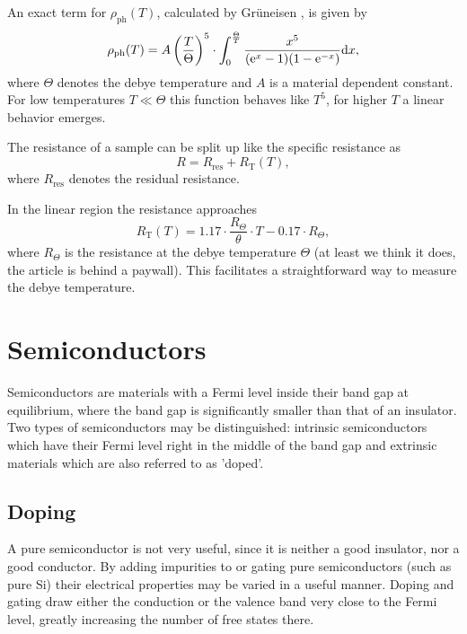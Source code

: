 An exact term for $\rho_\text{ph}(T)$, calculated by Grüneisen \cite{elresistancemetal}, is given by
\begin{equation}
	\rho_\text{ph}(T) = A \left(\frac{T}{\Theta}\right)^5 \cdot \int_0^\frac{\Theta}{T}\frac{x^5}{(\mathrm{e}^x - 1)(1 - \mathrm{e}^{-x})} \text{d} x,
\end{equation}
where $\Theta$ denotes the debye temperature and $A$ is a material dependent constant.
For low temperatures $T \ll \Theta$ this function behaves like $T^5$, for higher $T$ a linear behavior emerges.

The resistance of a sample can be split up like the specific resistance as
\begin{equation*}
	R = R_\text{res} + R_\text{T}(T),
\end{equation*}
where $R_\text{res}$ denotes the residual resistance.

In the linear region the resistance approaches \cite{elresistancemetal}
\begin{equation}\label{eq:borrel}
	R_\text{T}(T) = \num{1.17} \cdot \frac{R_\Theta}{\theta} \cdot T - \num{0.17} \cdot R_\Theta,
\end{equation}
where $R_\Theta$ is the resistance at the debye temperature $\Theta$ (at least we think it does, the article is behind a paywall).
This facilitates a straightforward way to measure the debye temperature.

\section{Semiconductors}
Semiconductors are materials with a Fermi level inside their band gap at equilibrium, where the band gap is significantly smaller than that of an insulator.
Two types of semiconductors may be distinguished: intrinsic semiconductors which have their Fermi level right in the middle of the band gap and extrinsic materials which are also referred to as 'doped'.

\subsection{Doping}
A pure semiconductor is not very useful, since it is neither a good insulator, nor a good conductor.
By adding impurities to or gating pure semiconductors (such as pure Si) their electrical properties may be varied in a useful manner.
Doping and gating draw either the conduction or the valence band very close to the Fermi level, greatly increasing the number of free states there.

